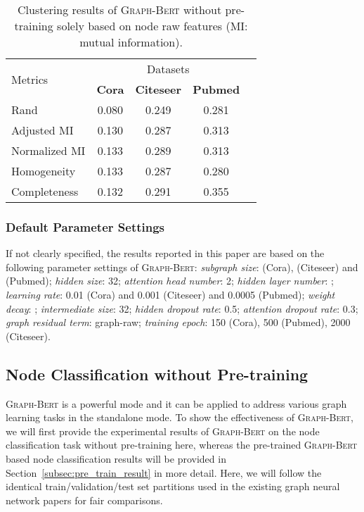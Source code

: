 \documentclass{article}
\newcommand{\our}{\textsc{Graph-Bert}}
\begin{document}
\begin{table}[t]
\caption{Clustering results of {\our} without pre-training solely based on node raw features (MI: mutual information).}\label{tab:graph_clustering}
\centering
\small
\setlength{\tabcolsep}{3pt}
\begin{tabular}{l c c c c }
\toprule
 \multirow{2}{*}{Metrics}  & \multicolumn{3}{c}{Datasets} \\
\cline{2-4}
\addlinespace[0.05cm]
& \textbf{Cora} & \textbf{Citeseer} & \textbf{Pubmed} \\
\hline
\addlinespace[0.05cm]

{Rand} &0.080  & 0.249  &0.281   \\
{Adjusted MI} &0.130 &0.287 &0.313  \\
{Normalized MI} &0.133  &0.289  &0.313   \\
{Homogeneity} &0.133  &0.287  &0.280  \\
{Completeness} &0.132  &0.291  &0.355  \\
\bottomrule
\end{tabular}
\end{table}


\subsubsection{Default Parameter Settings}

If not clearly specified, the results reported in this paper are based on the following parameter settings of {\our}: \textit{subgraph size}:  (Cora),  (Citeseer) and  (Pubmed); \textit{hidden size}: 32; \textit{attention head number}: 2; \textit{hidden layer number}: ; \textit{learning rate}: 0.01 (Cora) and 0.001 (Citeseer) and 0.0005 (Pubmed); \textit{weight decay}: ; \textit{intermediate size}: 32; \textit{hidden dropout rate}: 0.5; \textit{attention dropout rate}: 0.3; \textit{graph residual term}: graph-raw; \textit{training epoch}: 150 (Cora), 500 (Pubmed), 2000 (Citeseer).

\subsection{Node Classification without Pre-training}

{\our} is a powerful mode and it can be applied to address various graph learning tasks in the standalone mode. To show the effectiveness of {\our}, we will first provide the experimental results of {\our} on the node classification task without pre-training here, whereas the pre-trained {\our} based node classification results will be provided in Section~\ref{subsec:pre_train_result} in more detail. Here, we will follow the identical train/validation/test set partitions used in the existing graph neural network papers \cite{YCS16} for fair comparisons.
\end{document}
